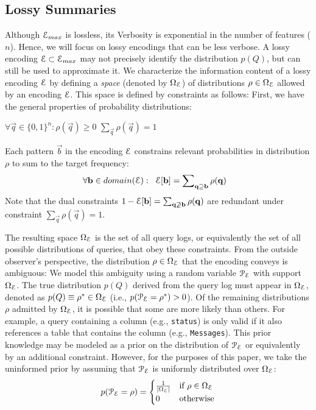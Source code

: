 \subsection{Lossy Summaries}
\label{sec:lossysummaries}
Although $\mathcal E_{max}$ is lossless, its Verbosity is exponential in the number of features ($n$). 
Hence, we will focus on lossy encodings that can be less verbose.
A lossy encoding $\mathcal E \subset \mathcal E_{max}$ may not precisely identify the distribution $p(Q)$, but can still be used to approximate it.
We characterize the information content of a lossy encoding $\mathcal E$ by defining a \emph{space} (denoted by $\Omega_\mathcal E$) of distributions $\rho \in \Omega_\mathcal E$ allowed by an encoding $\mathcal E$.
This space is defined by constraints as follows:
First, we have the general properties of probability distributions:
\begin{center}
$\forall \vec{q}\in\{0,1\}^n:\rho(\vec{q})\geq 0$
\hspace{10mm}
$\sum_{\vec{q}}\rho(\vec{q})=1$
\end{center}
Each pattern $\vec b$ in the encoding $\mathcal E$ constrains relevant probabilities in distribution $\rho$ to sum to the target frequency:
\begin{equation*}
\forall \mathbf{b} \in domain(\mathcal E)  :\;\; \mathcal E[\mathbf{b}] = \sum\nolimits_{\mathbf{q}\supseteq\mathbf{b}} \rho(\mathbf{q}) \;\;\;
\end{equation*}
Note that the dual constraints $1-\mathcal E[\mathbf{b}]=\sum_{\mathbf{q}\not\supseteq\mathbf{b}} \rho(\mathbf{q})$ are redundant under constraint $\sum_{\vec{q}}\rho(\vec{q})=1$.

The resulting space $\Omega_\mathcal E$ is the set of all query logs, or equivalently the set of all possible distributions of queries, that obey these constraints.
From the outside observer's perspective, the distribution $\rho\in\Omega_\mathcal E$ that the encoding conveys is ambiguous: We model this ambiguity using a random variable $\mathcal P_\mathcal E$ with support $\Omega_\mathcal E$.
The true distribution $p(Q)$ derived from the query log must appear in $\Omega_\mathcal E$, denoted as $p(Q)\equiv\rho^*\in\Omega_\mathcal E$ (i.e., $p(\mathcal P_\mathcal E = \rho^*) > 0$). 
Of the remaining distributions $\rho$ admitted by $\Omega_\mathcal E$, it is possible that some are more likely than others.
For example, a query containing a column (e.g., \texttt{status}) is only valid if it also references a table that contains the column (e.g., \texttt{Messages}).
This prior knowledge may be modeled as a prior on the distribution of $\mathcal P_\mathcal E$ or equivalently by an additional constraint.
However, for the purposes of this paper, we take the uninformed prior by assuming that $\mathcal P_\mathcal E$ is uniformly distributed over $\Omega_\mathcal E$:
\begin{equation*}
\label{uniformprior}
p(\mathcal P_\mathcal E = \rho) = 
\begin{cases}
\frac{1}{|\Omega_\mathcal E|} & \text{if } \rho \in \Omega_\mathcal E\\
0 & \text{otherwise}
\end{cases}
\end{equation*}

